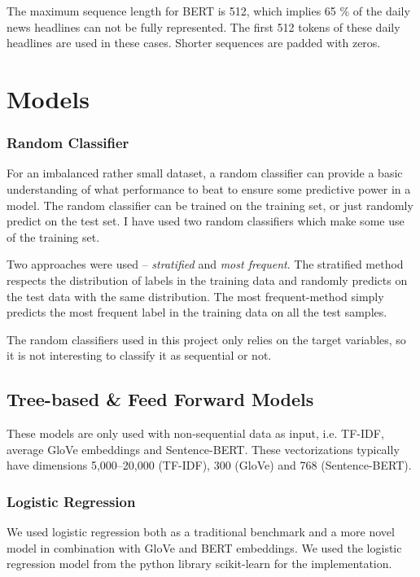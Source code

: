 The maximum sequence length for BERT is 512, which implies 65 \% of the daily news headlines can not be fully represented. The first 512 tokens of these daily headlines are used in these cases. Shorter sequences are padded with zeros.  

\section{Models}

\subsubsection{Random Classifier}

For an imbalanced rather small dataset, a random classifier can provide a basic understanding of what performance to beat to ensure some predictive power in a model. The random classifier can be trained on the training set, or just randomly predict on the test set. I have used two random classifiers which make some use of the training set. 

Two approaches were used -- \emph{stratified} and \emph{most frequent}. The stratified method respects the distribution of labels in the training data and randomly predicts on the test data with the same distribution. The most frequent-method simply predicts the most frequent label in the training data on all the test samples.

The random classifiers used in this project only relies on the target variables, so it is not interesting to classify it as sequential or not.  

\subsection{Tree-based \& Feed Forward Models}

These models are only used with non-sequential data as input, i.e. TF-IDF, average GloVe embeddings and Sentence-BERT. These vectorizations typically have dimensions 5,000--20,000 (TF-IDF), 300 (GloVe) and 768 (Sentence-BERT). 


\subsubsection{Logistic Regression}
We used logistic regression both as a traditional benchmark and a more novel model in combination with GloVe and BERT embeddings. We used the logistic regression model from the python library scikit-learn  for the implementation.

